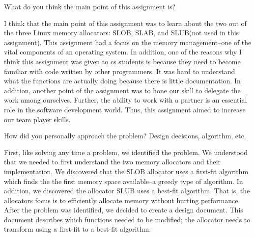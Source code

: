 \documentclass{article}
\newenvironment{question}[2][Question]{\begin{trivlist}
\item[\hskip \labelsep {\bfseries #1}\hskip \labelsep {\bfseries #2.}]}{\end{trivlist}}
\begin{document}
\begin{question}{1}
What do you think the main point of this assignment is?
\end{question}
I think that the main point of this assignment was to learn about the two out of the three Linux memory allocators: SLOB, SLAB, and SLUB(not used in this assignment). This assignment had a focus on the memory management--one of the vital components of an operating system. In addition, one of the reasons why I think this assignment was given to cs students is because they need to become familiar with code written by other programmers. It was hard to understand what the functions are actually doing because there is little documentation. In addition, another point of the assignment was to hone our skill to delegate the work among ourselves. Further, the ability to work with a partner is an essential role in the software development world. Thus, this assignment aimed to increase our team player skills. 






\vspace{0.25in} %

\begin{question}{2}
How did you personally approach the problem? Design decisions, algorithm, etc.
\end{question}
First, like solving any time a problem, we identified the problem. We understood that we needed to first understand the two memory allocators and their implementation. We discovered that the SLOB allocator uses a first-fit algorithm which finds the the first memory space available--a greedy type of algorithm. In addition, we discovered the allocator SLUB uses a best-fit algorithm. That is, the allocators focus is to efficiently allocate memory without hurting performance. After the problem was identified, we decided to create a design document. This document describes which functions needed to be modified; the allocator needs to transform using a first-fit to a best-fit algorithm.  




\vspace{0.25in} %
\end{document}
